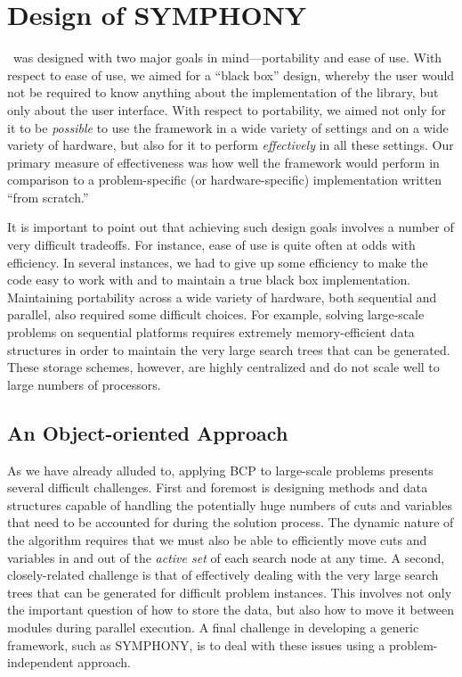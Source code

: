 \section{Design of SYMPHONY}
\label{design}

\BB\ was designed with two major goals in mind---portability and
ease of use. With respect to ease of use, we aimed for a ``black box''
design, whereby the user would not be required to know anything about
the implementation of the library, but only about the user interface.
With respect to portability, we aimed not only for it to be {\em
possible} to use the framework in a wide variety of settings and on a
wide variety of hardware, but also for it to perform {\em effectively} in all
these settings. Our primary measure of effectiveness was
how well the framework would perform in comparison to a problem-specific
(or hardware-specific) implementation written ``from scratch.''

It is important to point out that achieving such design goals involves
a number of very difficult tradeoffs. For instance, ease of use is quite
often at odds with efficiency. In several instances, we had to give up
some efficiency to make the code easy to work with and to maintain a
true black box implementation. Maintaining portability across a wide
variety of hardware, both sequential and parallel, also required some
difficult choices. For example, solving large-scale problems on
sequential platforms requires extremely memory-efficient data
structures in order to maintain the very large search trees that can
be generated. These storage schemes, however, are highly centralized
and do not scale well to large numbers of processors. 

\subsection{An Object-oriented Approach}

As we have already alluded to, applying BCP to large-scale problems
presents several difficult challenges. First and foremost is designing
methods and data structures capable of handling the potentially huge
numbers of cuts and variables that need to be accounted for during the
solution process. The dynamic nature of the algorithm requires that we
must also be able to efficiently move cuts and variables in and out of
the {\em active set} of each search node at any time. A second,
closely-related challenge is that of effectively dealing with the very
large search trees that can be generated for difficult problem
instances. This involves not only the important question of how to
store the data, but also how to move it between modules during
parallel execution. A final challenge in developing a generic
framework, such as SYMPHONY, is to deal with these issues using a
problem-independent approach.

